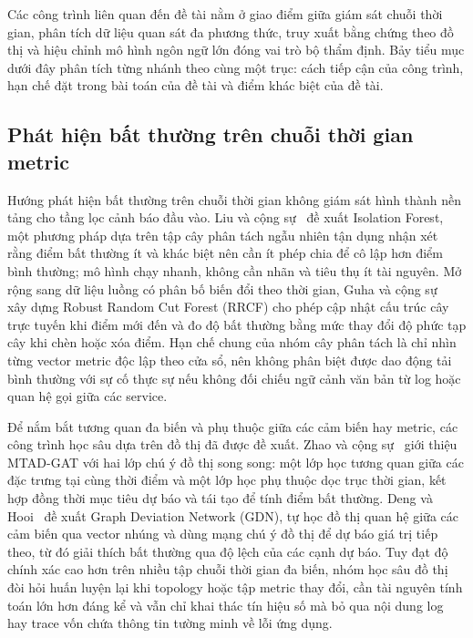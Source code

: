Các công trình liên quan đến đề tài nằm ở giao điểm giữa giám sát chuỗi thời gian, phân tích dữ liệu quan sát đa phương thức, truy xuất bằng chứng theo đồ thị và hiệu chỉnh mô hình ngôn ngữ lớn đóng vai trò bộ thẩm định. Bảy tiểu mục dưới đây phân tích từng nhánh theo cùng một trục: cách tiếp cận của công trình, hạn chế đặt trong bài toán của đề tài và điểm khác biệt của đề tài.

\subsection{Phát hiện bất thường trên chuỗi thời gian metric}
\label{sec:ch3-tsad}

Hướng phát hiện bất thường trên chuỗi thời gian không giám sát hình thành nền tảng cho tầng lọc cảnh báo đầu vào. Liu và cộng sự~\cite{liu2008iforest} đề xuất Isolation Forest, một phương pháp dựa trên tập cây phân tách ngẫu nhiên tận dụng nhận xét rằng điểm bất thường ít và khác biệt nên cần ít phép chia để cô lập hơn điểm bình thường; mô hình chạy nhanh, không cần nhãn và tiêu thụ ít tài nguyên. Mở rộng sang dữ liệu luồng có phân bố biến đổi theo thời gian, Guha và cộng sự~\cite{guha2016rrcf} xây dựng Robust Random Cut Forest (RRCF) cho phép cập nhật cấu trúc cây trực tuyến khi điểm mới đến và đo độ bất thường bằng mức thay đổi độ phức tạp cây khi chèn hoặc xóa điểm. Hạn chế chung của nhóm cây phân tách là chỉ nhìn từng vector metric độc lập theo cửa sổ, nên không phân biệt được dao động tải bình thường với sự cố thực sự nếu không đối chiếu ngữ cảnh văn bản từ log hoặc quan hệ gọi giữa các service.

Để nắm bắt tương quan đa biến và phụ thuộc giữa các cảm biến hay metric, các công trình học sâu dựa trên đồ thị đã được đề xuất. Zhao và cộng sự~\cite{zhao2020mtadgat} giới thiệu MTAD-GAT với hai lớp chú ý đồ thị song song: một lớp học tương quan giữa các đặc trưng tại cùng thời điểm và một lớp học phụ thuộc dọc trục thời gian, kết hợp đồng thời mục tiêu dự báo và tái tạo để tính điểm bất thường. Deng và Hooi~\cite{deng2021gdn} đề xuất Graph Deviation Network (GDN), tự học đồ thị quan hệ giữa các cảm biến qua vector nhúng và dùng mạng chú ý đồ thị để dự báo giá trị tiếp theo, từ đó giải thích bất thường qua độ lệch của các cạnh dự báo. Tuy đạt độ chính xác cao hơn trên nhiều tập chuỗi thời gian đa biến, nhóm học sâu đồ thị đòi hỏi huấn luyện lại khi topology hoặc tập metric thay đổi, cần tài nguyên tính toán lớn hơn đáng kể và vẫn chỉ khai thác tín hiệu số mà bỏ qua nội dung log hay trace vốn chứa thông tin tường minh về lỗi ứng dụng.

